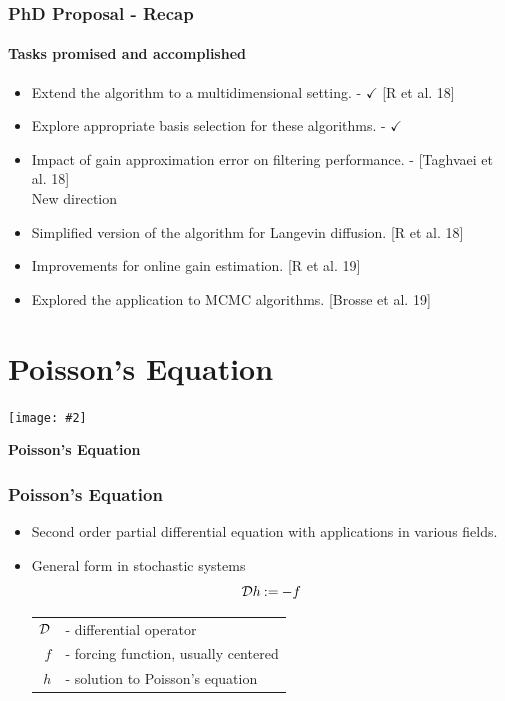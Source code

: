 \documentclass[xcolor=dvipsnames, subsection=false]{beamer}
\def\alertb#1{\alert{\color{BrickRed}  #1}}
\def\alertb#1{\alert{\color{BrickRed}  #1}}
\newcounter{temp}
\newenvironment{framesection}%
{\setcounter{temp}{\value{framenumber}}
\begin{frame}
\thispagestyle{empty}
}%
{\end{frame}\setcounter{framenumber}{\value{temp}}}
\def\Ebox#1#2{%
	\begin{center}
		\texttt{[image: \#2]} %
	\end{center}}
\def\eqdef{\mathbin{:=}}
\def\generate{{\cal D}}
\def\rd#1{{\color{red}#1}}
\def\bl#1{{\color{blue}#1}}
\def\gn#1{{\color{green}#1}}
\begin{document}
\begin{frame}
\frametitle{PhD Proposal - Recap}
\framesubtitle{Tasks promised and accomplished}
\begin{itemize}
\item Extend the algorithm to a multidimensional setting. \pause - \gn{$\checkmark$} {\footnotesize \bl{[R et al. 18]}}
\item Explore appropriate basis selection for these algorithms. \pause - \gn{$\checkmark$} 
\item Impact of gain approximation error on filtering performance. \pause - \rd{} {\footnotesize \bl{[Taghvaei et al. 18]}} \\[0.5cm]
\alertb{New direction} \\
\item Simplified version of the algorithm for Langevin diffusion. {\footnotesize \bl{[R et al. 18]}}
\item Improvements for online gain estimation. {\footnotesize \bl{[R et al. 19]}}
\item Explored the application to MCMC algorithms. {\footnotesize \bl{[Brosse et al. 19]}}
\end{itemize}
\end{frame}

\section{Poisson's Equation}

\begin{framesection}
	
	
	\Ebox{.6}{FishBanner.pdf}
	
	\vfill
	
	\centerline{\Large\bf Poisson's Equation}
	
\end{framesection}


\begin{frame}
\frametitle{Poisson's Equation}
\begin{itemize}
	\item Second order partial differential equation with applications in various fields.
	\item General form in stochastic systems
	{\LARGE
	\[
	\generate h  \eqdef  -f
	\]
    }
	
	
	\begin{tabular}{rl}
$\generate$ & - differential operator\\
$f$ & - forcing function, usually centered\\
{\LARGE \alertb{$h$}} & {\LARGE \alertb{- solution to Poisson's equation}}
	\end{tabular}
\end{itemize}
\end{frame}
\end{document}
